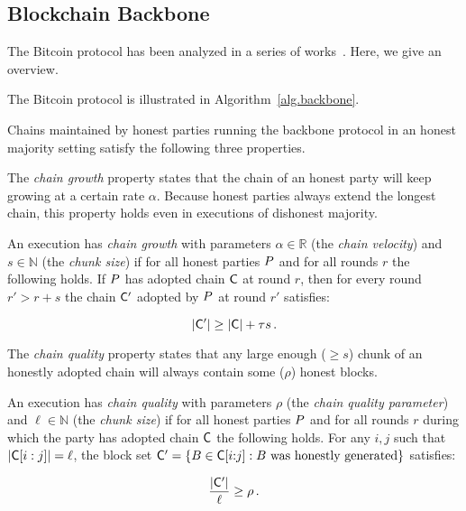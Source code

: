 \subsection{Blockchain Backbone}

The Bitcoin protocol has been analyzed in a series of
works~\cite{backbone,varbackbone,pass-asynchronous,composable-bitcoin}. Here, we
give an overview.

The Bitcoin protocol is illustrated in Algorithm~\ref{alg.backbone}.




Chains maintained by honest parties running the backbone protocol in an honest
majority setting satisfy the following three properties.

The \emph{chain growth} property states that the chain of an honest party will
keep growing at a certain rate $\alpha$. Because honest parties always extend the
longest chain, this property holds even in executions of dishonest majority.

\begin{definition}
  An execution has \emph{chain growth} with parameters $\alpha \in \mathbb{R}$
  (the \emph{chain velocity}) and $s \in \mathbb{N}$ (the \emph{chunk size}) if
  for all honest parties $P$ and for all rounds $r$ the following holds. If
  $P$ has adopted chain $\mathsf{C}$ at round $r$, then for every round $r' > r
  + s$ the chain $\mathsf{C}'$ adopted by $P$ at round $r'$ satisfies:

  \[
  |\mathsf{C}'| \geq |\mathsf{C}| + \tau s
  \,.
  \]
\end{definition}

The \emph{chain quality} property states that any large enough ($\geq s$) chunk
of an honestly adopted chain will always contain some ($\rho$) honest blocks.

\begin{definition}
  An execution has \emph{chain quality} with parameters $\rho$ (the
  \emph{chain quality parameter}) and $\ell \in \mathbb{N}$ (the \emph{chunk size})
  if for all honest parties $P$ and for all rounds $r$ during which the
  party has adopted chain $\mathsf{C}$ the following holds. For any $i, j$ such that
  $|\mathsf{C}[i:j]| = \ell$, the block set $\mathsf{C}' = \{B \in \mathsf{C}[i{:}j]: B \text{
  was honestly generated}\}$ satisfies:

  \[
  \frac{|\mathsf{C}'|}{\ell} \geq \rho
  \,.
  \]
\end{definition}

